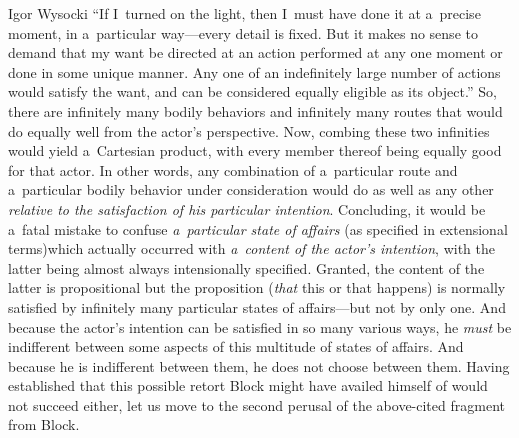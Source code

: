 \begin{artengenv}{Igor Wysocki}
{ ``If I~turned on the light, then I~must have done it at a~precise moment, in a~particular way---every detail is fixed. But it makes no sense to demand that my want be directed at an action performed at any one moment or done in some unique manner. Any one of an indefinitely large number of actions would satisfy the want, and can be considered equally eligible as its object.''} So, there are infinitely many bodily behaviors and infinitely many routes that would do equally well from the actor's perspective. Now, combing these two infinities would yield a~Cartesian product, with every member thereof being equally good for that actor. In other words, any combination of a~particular route and a~particular bodily behavior under consideration would do as well as any other \textit{relative to the satisfaction of his particular intention}. Concluding, it would be a~fatal mistake to confuse \textit{a~particular state of affairs} (as specified in extensional terms)which actually occurred with \textit{a~content of the actor's intention}, with the latter being almost always intensionally specified. Granted, the content of the latter is propositional but the proposition (\textit{that} this or that happens) is normally satisfied by infinitely many particular states of affairs---but not by only one. And because the actor's intention can be satisfied in so many various ways, he \textit{must} be indifferent between some aspects of this multitude of states of affairs. And because he is indifferent between them, he does not choose between them. Having established that this possible retort Block might have availed himself of would not succeed either, let us move to the second perusal of the above-cited fragment from Block.


\end{artengenv}
